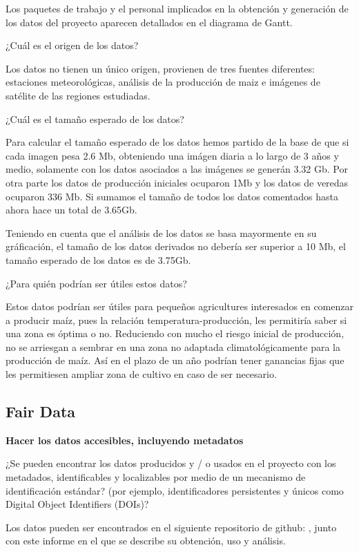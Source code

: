 \documentclass[12pt, spanish]{article}
\begin{document}
Los paquetes de trabajo y el personal implicados en la obtención y generación de los datos del proyecto aparecen detallados en el diagrama de Gantt.

\begin{shaded}
¿Cuál es el origen de los datos?
\end{shaded}
Los datos no tienen un único origen, provienen de tres fuentes diferentes: estaciones meteorológicas, análisis de la producción de maiz e imágenes de satélite de las regiones estudiadas.

\begin{shaded}
¿Cuál es el tamaño esperado de los datos?
\end{shaded}

Para calcular el tamaño esperado de los datos hemos partido de la base de que si cada imagen pesa 2.6 Mb, obteniendo una imágen diaria a lo largo de 3 años y medio, solamente con los datos asociados a las imágenes se generán 3.32 Gb. Por otra parte los datos de producción iniciales ocuparon 1Mb y los datos de veredas ocuparon 336 Mb. Si sumamos el tamaño de todos los datos comentados hasta ahora hace un total de 3.65Gb.

Teniendo en cuenta que el análisis de los datos se basa mayormente en su gráficación, el tamaño de los datos derivados no debería ser superior a 10 Mb, el tamaño esperado de los datos es de 3.75Gb.

\begin{shaded}
¿Para quién podrían ser útiles estos datos?
\end{shaded}
Estos datos podrían ser útiles para pequeños agricultures interesados en comenzar a producir maíz, pues la relación temperatura-producción, les permitiría saber si una zona es óptima o no. Reduciendo con mucho el riesgo inicial de producción, no se arriesgan a sembrar en una zona no adaptada climatológicamente para la producción de maíz. Así en el plazo de un año podrían tener ganancias fijas que les permitiesen ampliar zona de cultivo en caso de ser necesario.


\subsection{Fair Data}





\textbf{Hacer los datos accesibles, incluyendo metadatos}

\begin{shaded}
¿Se pueden encontrar los datos producidos y / o usados en el proyecto con los metadados, identificables y localizables por medio de un mecanismo  de identificación estándar? (por ejemplo, identificadores persistentes y únicos como Digital Object Identifiers (DOIs)?
\end{shaded}
Los datos pueden ser encontrados en el siguiente repositorio de github: , junto con este informe en el que se describe su obtención, uso y análisis. 
\end{document}
